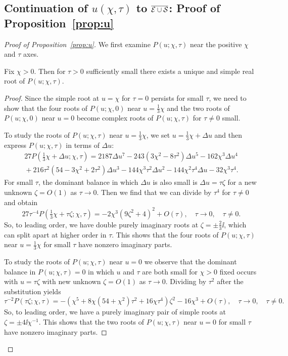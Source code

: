 \subsection{Continuation of $u(\chi,\tau)$ to $\overline{\mathcal{E}\cup\mathcal{S}}$:  Proof of Proposition~\ref{prop:u}}
\begin{proof}[Proof of Proposition~\ref{prop:u}]
We first examine $P(u;\chi,\tau)$ near the positive $\chi$ and $\tau$ axes.  
\begin{lemma}
Fix $\chi>0$.  Then for $\tau>0$ sufficiently small there exists a unique and simple real root of $P(u;\chi,\tau)$.
\label{lem:tau-small}
\end{lemma}
\begin{proof}
Since the simple root at $u=\chi$ for $\tau=0$ persists for small $\tau$, we need to show that the four roots of $P(u;\chi,0)$ near $u=\tfrac{1}{3}\chi$ and the two roots of $P(u;\chi,0)$ near $u=0$ become complex roots of $P(u;\chi,\tau)$ for $\tau\neq 0$ small.  

To study the roots of $P(u;\chi,\tau)$ near $u=\tfrac{1}{3}\chi$, we set $u=\tfrac{1}{3}\chi + \Delta u$ and then express $P(u;\chi,\tau)$ in terms of $\Delta u$:
\begin{multline}
27 P(\tfrac{1}{3}\chi+\Delta u;\chi,\tau)=2187\Delta u^7 - 243(3\chi^2-8\tau^2)\Delta u^5-162\chi^3\Delta u^4 \\{}+ 216\tau^2(54-3\chi^2+2\tau^2)\Delta u^3
-144\chi^3\tau^2\Delta u^2-144\chi^2\tau^4\Delta u-32\chi^3\tau^4.
\end{multline}
For small $\tau$, the dominant balance in which $\Delta u$ is also small is $\Delta u=\tau\zeta$ for a new unknown $\zeta=O(1)$ as $\tau\to 0$.  Then we find that we can divide by $\tau^4$ for $\tau\neq 0$ and obtain
\begin{equation}
27 \tau^{-4}P(\tfrac{1}{3}\chi +\tau\zeta;\chi,\tau)=-2\chi^3 (9\zeta^2+4)^2 + O(\tau),\quad\tau\to 0,\quad\tau\neq 0.
\end{equation}
So, to leading order, we have double purely imaginary roots at $\zeta=\pm\tfrac{2}{3}\ii$, which can split apart at higher order in $\tau$.  This shows that the four roots of $P(u;\chi,\tau)$ near $u=\tfrac{1}{3}\chi$ for small $\tau$ have nonzero imaginary parts.  

To study the roots of $P(u;\chi,\tau)$ near $u=0$ we observe that the dominant balance in $P(u;\chi,\tau)=0$ in which $u$ and $\tau$ are both small for $\chi>0$ fixed occurs with $u=\tau\zeta$ with new unknown $\zeta=O(1)$ as $\tau\to 0$.  Dividing by $\tau^2$ after the substitution yields
\begin{equation}
\tau^{-2}P(\tau\zeta;\chi,\tau)=-(\chi^5+ 8\chi(54+\chi^2)\tau^2+16\chi\tau^4)\zeta^2-16\chi^3 + O(\tau),\quad\tau\to 0,\quad\tau\neq 0.
\end{equation}
So, to leading order, we have a purely imaginary pair of simple roots at $\zeta=\pm 4\ii\chi^{-1}$.  This shows that the two roots of $P(u;\chi,\tau)$ near $u=0$ for small $\tau$ have nonzero imaginary parts.
\end{proof}


\end{proof}
